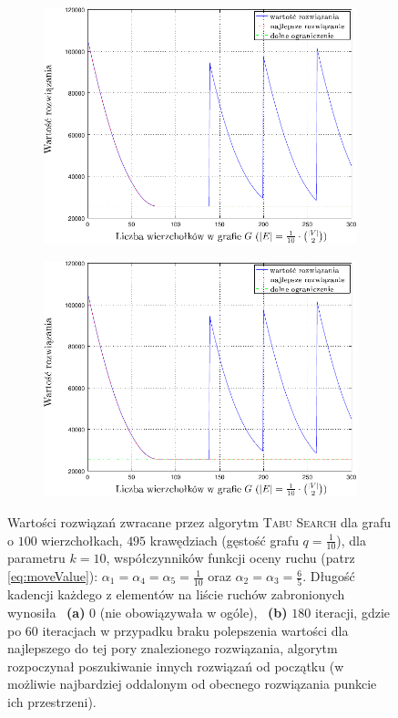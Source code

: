 \begin{figure}[!htbp]
	\ContinuedFloat
	\null\hfill
	\begin{subfigure}[b]{0.45\textwidth}
		\includegraphics[width=\textwidth]{Chapter_VI/RRIMST3-example/RRIMST3_psfrag}
		\caption{}
		\label{fig:rrimst1:c}
	\end{subfigure}
	\hfill
	\begin{subfigure}[b]{0.45\textwidth}
		\includegraphics[width=\textwidth]{Chapter_VI/RRIMST4-example/RRIMST4_psfrag}
		\caption{}
		\label{fig:rrimst1:d}
	\end{subfigure}
	\hfill\null
	\caption{
		Wartości rozwiązań zwracane przez algorytm \textsc{Tabu Search} dla grafu o $100$ wierzchołkach, $495$ krawędziach (gęstość grafu $q = \frac{1}{10}$), dla parametru $k = 10$, współczynników funkcji oceny ruchu (patrz \ref{eq:moveValue}): $\alpha_{1} = \alpha_{4} = \alpha_{5} = \frac{1}{10}$ oraz $\alpha_{2} = \alpha_{3} = \frac{6}{5}$. Długość kadencji każdego z elementów na liście ruchów zabronionych wynosiła ~\textbf{(a)} $0$ (nie obowiązywała w ogóle), ~\textbf{(b)} $180$ iteracji, gdzie po $60$ iteracjach w przypadku braku polepszenia wartości dla najlepszego do tej pory znalezionego rozwiązania, algorytm rozpoczynał poszukiwanie innych rozwiązań od początku (w możliwie najbardziej oddalonym od obecnego rozwiązania punkcie ich przestrzeni).
	}
	\label{fig:rrimst1}
\end{figure}

